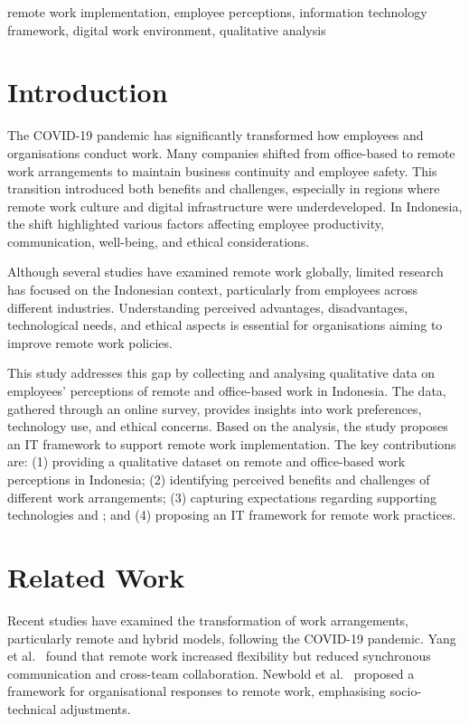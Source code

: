 \documentclass[conference]{IEEEtran}
\begin{document}
\begin{IEEEkeywords}
remote work implementation, employee perceptions, information technology framework, digital work environment, qualitative analysis
\end{IEEEkeywords}


\section{Introduction}

The COVID-19 pandemic has significantly transformed how employees and organisations conduct work. Many companies shifted from office-based to remote work arrangements to maintain business continuity and employee safety. This transition introduced both benefits and challenges, especially in regions where remote work culture and digital infrastructure were underdeveloped. In Indonesia, the shift highlighted various factors affecting employee productivity, communication, well-being, and ethical considerations.

Although several studies have examined remote work globally, limited research has focused on the Indonesian context, particularly from employees across different industries. Understanding perceived advantages, disadvantages, technological needs, and ethical aspects is essential for organisations aiming to improve remote work policies.

This study addresses this gap by collecting and analysing qualitative data on employees' perceptions of remote and office-based work in Indonesia. The data, gathered through an online survey, provides insights into work preferences, technology use, and ethical concerns. Based on the analysis, the study proposes an IT framework to support remote work implementation. The key contributions are: (1) providing a qualitative dataset on remote and office-based work perceptions in Indonesia; (2) identifying perceived benefits and challenges of different work arrangements; (3) capturing expectations regarding supporting technologies and ; and (4) proposing an IT framework for remote work practices.


\section{Related Work}

Recent studies have examined the transformation of work arrangements, particularly remote and hybrid models, following the COVID-19 pandemic. Yang et al.~\cite{yang2022effects} found that remote work increased flexibility but reduced synchronous communication and cross-team collaboration. Newbold et al.~\cite{Newbold2022NewNormals} proposed a framework for organisational responses to remote work, emphasising socio-technical adjustments.
\end{document}
